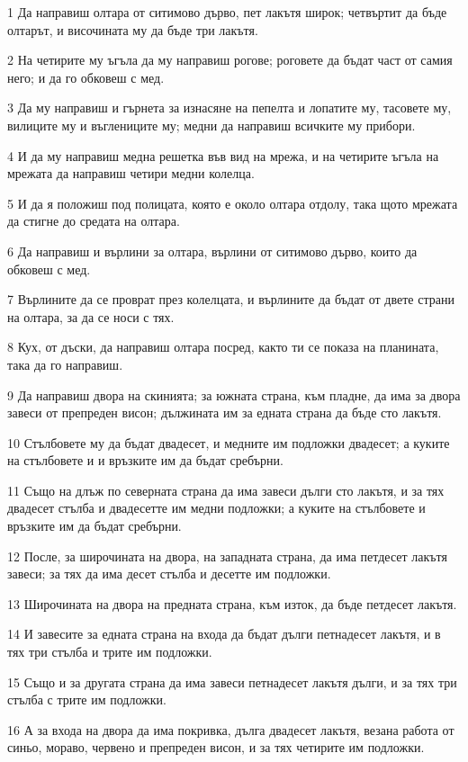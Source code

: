 \par 1 Да направиш олтара от ситимово дърво, пет лакътя широк; четвъртит да бъде олтарът, и височината му да бъде три лакътя.
\par 2 На четирите му ъгъла да му направиш рогове; роговете да бъдат част от самия него; и да го обковеш с мед.
\par 3 Да му направиш и гърнета за изнасяне на пепелта и лопатите му, тасовете му, вилиците му и въглениците му; медни да направиш всичките му прибори.
\par 4 И да му направиш медна решетка във вид на мрежа, и на четирите ъгъла на мрежата да направиш четири медни колелца.
\par 5 И да я положиш под полицата, която е около олтара отдолу, така щото мрежата да стигне до средата на олтара.
\par 6 Да направиш и върлини за олтара, върлини от ситимово дърво, които да обковеш с мед.
\par 7 Върлините да се проврат през колелцата, и върлините да бъдат от двете страни на олтара, за да се носи с тях.
\par 8 Кух, от дъски, да направиш олтара посред, както ти се показа на планината, така да го направиш.
\par 9 Да направиш двора на скинията; за южната страна, към пладне, да има за двора завеси от препреден висон; дължината им за едната страна да бъде сто лакътя.
\par 10 Стълбовете му да бъдат двадесет, и медните им подложки двадесет; а куките на стълбовете и и връзките им да бъдат сребърни.
\par 11 Също на длъж по северната страна да има завеси дълги сто лакътя, и за тях двадесет стълба и двадесетте им медни подложки; а куките на стълбовете и връзките им да бъдат сребърни.
\par 12 После, за широчината на двора, на западната страна, да има петдесет лакътя завеси; за тях да има десет стълба и десетте им подложки.
\par 13 Широчината на двора на предната страна, към изток, да бъде петдесет лакътя.
\par 14 И завесите за едната страна на входа да бъдат дълги петнадесет лакътя, и в тях три стълба и трите им подложки.
\par 15 Също и за другата страна да има завеси петнадесет лакътя дълги, и за тях три стълба с трите им подложки.
\par 16 А за входа на двора да има покривка, дълга двадесет лакътя, везана работа от синьо, мораво, червено и препреден висон, и за тях четирите им подложки.
